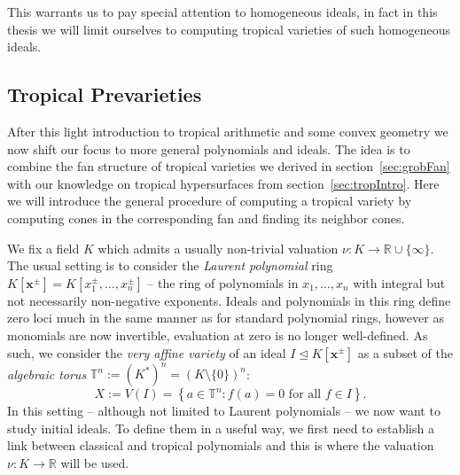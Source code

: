 \documentclass[
  paper=a4,
  titlepage,
  bibliography=totoc,
  listof=totoc,
  pagesize=pdftex
]{scrartcl}
\numberwithin{figure}{section}
\numberwithin{equation}{section}
\numberwithin{table}{section}
\newcommand*\setR{\mathds{R}}
\newcommand*\setT{\mathds{T}}
\let\vec\mathbf
\let\idealof\trianglelefteq
\theoremstyle{definition}
\numberwithin{definition}{section}
\begin{document}
This warrants us to pay special attention to homogeneous ideals, in fact in this thesis we
will limit ourselves to computing tropical varieties of such homogeneous ideals.


\subsection{Tropical Prevarieties}
\label{sec:tropPre}

After this light introduction to tropical arithmetic and some convex geometry we now shift
our focus to more general polynomials and ideals. The idea is to combine the fan structure
of tropical varieties we derived in section~\ref{sec:grobFan} with our knowledge on
tropical hypersurfaces from section~\ref{sec:tropIntro}. Here we will introduce the
general procedure of computing a tropical variety by computing cones in the corresponding
fan and finding its neighbor cones.

We fix a field $K$ which admits a usually non-trivial valuation $\nu : K \to \setR \cup
\{\infty\}$. The usual setting is to consider the \emph{Laurent polynomial} ring $K[\vec
x^\pm] = K[x_1^\pm, \dots, x_n^\pm]$ -- the ring of polynomials in $x_1, \dots, x_n$ with
integral but not necessarily non-negative exponents. Ideals and polynomials in this ring
define zero loci much in the same manner as for standard polynomial rings, however as
monomials are now invertible, evaluation at zero is no longer well-defined. As such, we
consider the \emph{very affine variety} of an ideal $I \idealof K[\vec x^\pm]$ as a subset
of the \emph{algebraic torus} $\setT^n := {(K^*)}^n = {(K \setminus \{0\})}^n$:
\[
  X := V(I) = \left\{ a \in \setT^n : f(a) = 0 \text{ for all $f \in I$} \right\}.
\]
In this setting -- although not limited to Laurent polynomials -- we now want to study
initial ideals. To define them in a useful way, we first need to establish a link between
classical and tropical polynomials and this is where the valuation $\nu:K\to\setR$ will be
used.
\end{document}
